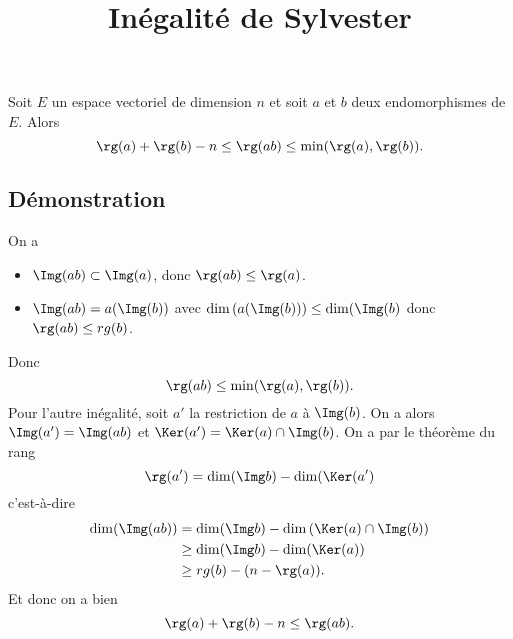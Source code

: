 \documentclass[fontsize=12pt,twoside=false,parskip=half,french]{scrartcl}
\title{Inégalité de Sylvester}
\date{}
\author{}
\begin{document}
\maketitle
   \begin{Theoreme}
      Soit $E$ un espace vectoriel de dimension $n$ et soit $a$ et $b$ deux 
      endomorphismes de $E$. Alors
      \[
         \rg(a) + \rg(b) - n \leq \rg(ab) \leq \min(\rg(a), \rg(b)).
      \]
   \end{Theoreme}
   \subsection{Démonstration}
      On a 
      \begin{itemize}
         \item $\Img(ab) \subset \Img(a)$, donc $\rg(ab) \leq \rg(a)$. 
         \item $\Img(ab) = a(\Img(b))$ avec $\dim\left(a(\Img(b))\right) \leq \dim(\Img(b)$
               donc $\rg(ab) \leq rg(b)$.
      \end{itemize}
      Donc
      \[
        \rg(ab) \leq \min(\rg(a), \rg(b)).
      \]
      Pour l'autre inégalité, soit $a'$ la restriction de $a$ à $\Img(b)$. On
      a alors $\Img(a') = \Img(ab)$ et $\Ker(a') = \Ker(a) \cap \Img(b)$. On a
      par le théorème du rang
      \[
         \rg(a') = \dim(\Img b) - \dim(\Ker(a')
      \]
      c'est-à-dire
      \begin{align*}
         \dim(\Img(ab)) &= \dim(\Img b) - \dim\left( \Ker(a) \cap \Img(b) \right)\\
                       &\geq \dim(\Img b) - \dim(\Ker(a))\\
                       &\geq rg(b) - (n - \rg(a)).
      \end{align*}
      Et donc on a bien
      \[
        \rg(a) + \rg(b) - n \leq \rg(ab).
      \]
\end{document}
